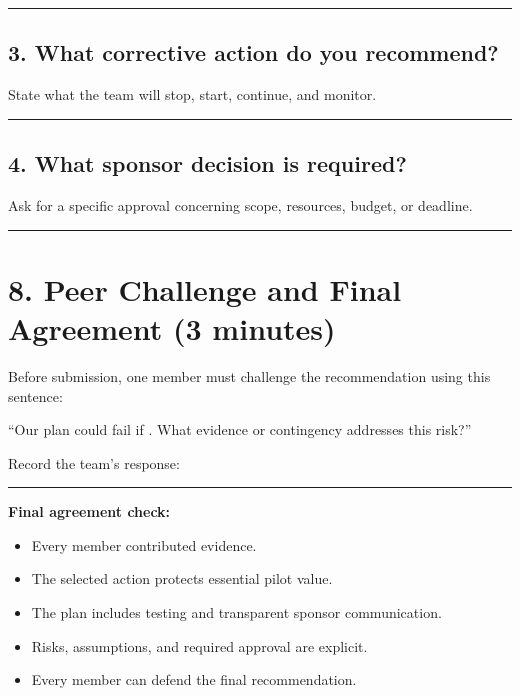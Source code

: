 \documentclass[11pt,a4paper]{article}
\newcommand{\blankline}{\rule{\linewidth}{0.35pt}}
\begin{document}
\vspace{7mm}\blankline

\subsection*{3. What corrective action do you recommend?}
State what the team will stop, start, continue, and monitor.

\vspace{7mm}\blankline

\subsection*{4. What sponsor decision is required?}
Ask for a specific approval concerning scope, resources, budget, or deadline.

\vspace{7mm}\blankline

\section{8. Peer Challenge and Final Agreement (3 minutes)}

Before submission, one member must challenge the recommendation using this sentence:

\begin{missionbox}
``Our plan could fail if \underline{\hspace{5cm}}. What evidence or contingency addresses this risk?''
\end{missionbox}

Record the team's response:

\vspace{10mm}\blankline

\textbf{Final agreement check:}

\begin{itemize}
  \item[$\square$] Every member contributed evidence.
  \item[$\square$] The selected action protects essential pilot value.
  \item[$\square$] The plan includes testing and transparent sponsor communication.
  \item[$\square$] Risks, assumptions, and required approval are explicit.
  \item[$\square$] Every member can defend the final recommendation.
\end{itemize}
\end{document}
